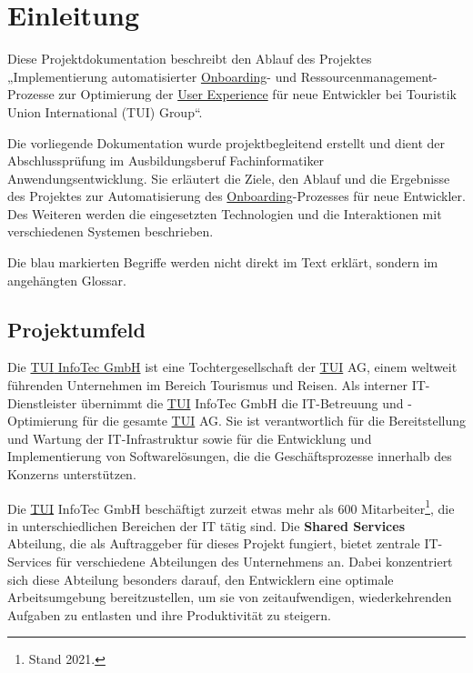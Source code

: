 \section{Einleitung}
\label{sec:Einleitung}

Diese Projektdokumentation beschreibt den Ablauf des Projektes „Implementierung automatisierter \hyperlink{Onboarding}{\textcolor{AOBlau}{Onboarding}}- und Ressourcenmanagement-Prozesse zur Optimierung der \hyperlink{UserExperience}{\textcolor{AOBlau}{User Experience}} für neue Entwickler bei Touristik Union International (TUI) Group“. 

Die vorliegende Dokumentation wurde projektbegleitend erstellt und dient der Abschlussprüfung im Ausbildungsberuf Fachinformatiker Anwendungsentwicklung. Sie erläutert die Ziele, den Ablauf und die Ergebnisse des Projektes zur Automatisierung des \hyperlink{Onboarding}{\textcolor{AOBlau}{Onboarding}}-Prozesses für neue Entwickler. Des Weiteren werden die eingesetzten Technologien und die Interaktionen mit verschiedenen Systemen beschrieben. 

Die \textcolor{AOBlau}{blau} markierten Begriffe werden nicht direkt im Text erklärt, sondern im angehängten Glossar.

\subsection{Projektumfeld} 
\label{sec:Projektumfeld}

Die \hyperlink{TUI}{\textcolor{AOBlau}{TUI} InfoTec GmbH} ist eine Tochtergesellschaft der \hyperlink{TUI}{\textcolor{AOBlau}{TUI}} AG, einem weltweit führenden Unternehmen im Bereich Tourismus und Reisen. Als interner IT-Dienstleister übernimmt die \hyperlink{TUI}{\textcolor{AOBlau}{TUI}} InfoTec GmbH die IT-Betreuung und -Optimierung für die gesamte \hyperlink{TUI}{\textcolor{AOBlau}{TUI}} AG. Sie ist verantwortlich für die Bereitstellung und Wartung der IT-Infrastruktur sowie für die Entwicklung und Implementierung von Softwarelösungen, die die Geschäftsprozesse innerhalb des Konzerns unterstützen.

Die \hyperlink{TUI}{\textcolor{AOBlau}{TUI}} InfoTec GmbH beschäftigt zurzeit etwas mehr als 600 Mitarbeiter\footnote{Stand 2021.}, die in unterschiedlichen Bereichen der IT tätig sind. Die \textbf{Shared Services} Abteilung, die als Auftraggeber für dieses Projekt fungiert, bietet zentrale IT-Services für verschiedene Abteilungen des Unternehmens an. Dabei konzentriert sich diese Abteilung besonders darauf, den Entwicklern eine optimale Arbeitsumgebung bereitzustellen, um sie von zeitaufwendigen, wiederkehrenden Aufgaben zu entlasten und ihre Produktivität zu steigern.

